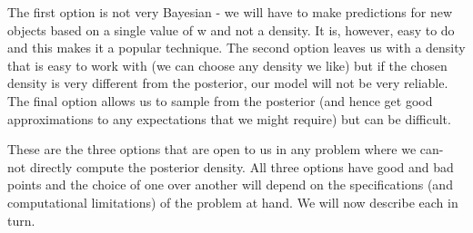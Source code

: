 The first option is not very Bayesian - we will have to make predictions for new
objects based on a single value of w and not a density. It is, however, easy to do and
this makes it a popular technique. The second option leaves us with a density that
is easy to work with (we can choose any density we like) but if the chosen density
is very different from the posterior, our model will not be very reliable. The final
option allows us to sample from the posterior (and hence get good approximations
to any expectations that we might require) but can be difficult.

These are the three options that are open to us in any problem where we can-
not directly compute the posterior density. All three options have good and bad
points and the choice of one over another will depend on the specifications (and
computational limitations) of the problem at hand. We will now describe each in
turn.

